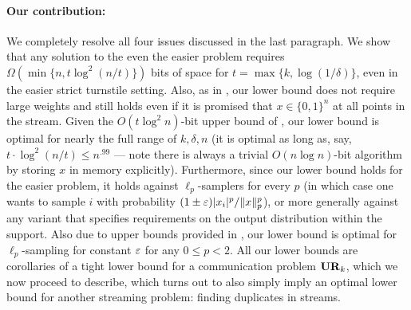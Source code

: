 \paragraph{Our contribution:} We completely resolve all four issues discussed in the last paragraph. We show that any solution to the even the easier  problem requires $\Omega(\min\{n, t \log^2(n/t)\})$ bits of space for $t = \max\{k, \log(1/\delta)\}$, even in the easier strict turnstile setting. Also, as in \cite{JowhariST11}, our lower bound does not require large weights and still holds even if it is promised that $x\in\{0,1\}^n$ at all points in the stream. Given the $O(t\log^2 n)$-bit upper bound of \cite{JowhariST11}, our lower bound is optimal for nearly the full range of $k, \delta, n$ (it is optimal as long as, say, $t\cdot \log^2(n/t)\le n^{.99}$ --- note there is always a trivial $O(n \log n)$-bit algorithm by storing $x$ in memory explicitly). Furthermore, since our lower bound holds for the easier \suppfind{} problem, it holds against $\ell_p$-samplers for every $p$ (in which case one wants to sample $i$ with probability $(1\pm\varepsilon)|x_i|^p/\|x\|_p^p$), or more generally against any variant that specifies requirements on the output distribution within the support. Also due to upper bounds provided in \cite{JowhariST11}, our lower bound is optimal for $\ell_p$-sampling for constant $\varepsilon$ for any $0\le p<2$.  All our lower bounds are corollaries of a tight lower bound for a communication problem $\mathbf{UR}_k$, which we now proceed to describe, which turns out to also simply imply an optimal lower bound for another streaming problem: finding duplicates in streams.




